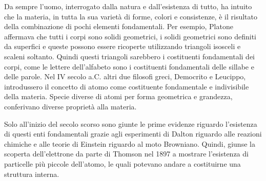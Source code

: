 \documentclass[../main.tex]{subfiles}
\begin{document}
Da sempre l'uomo, interrogato dalla natura e dall'esistenza di tutto, ha intuito che la materia, in tutta la sua varietà di forme, colori e consistenze, è il risultato della combinazione di pochi elementi fondamentali. Per esempio, Platone affermava che tutti i corpi sono solidi geometrici, i solidi geometrici sono definiti da superfici e queste possono essere ricoperte utilizzando triangoli isosceli e scaleni soltanto. Quindi questi triangoli sarebbero i costituenti fondamentali dei corpi, come le lettere dell'alfabeto sono i costituenti fondamentali delle sillabe e delle parole. Nel IV secolo a.C. altri due filosofi greci, Democrito e Leucippo, introdussero il concetto di atomo come costituente fondamentale e indivisibile della materia. Specie diverse di atomi per forma geometrica e grandezza, conferivano diverse proprietà alla materia.

Solo all'inizio del secolo scorso sono giunte le prime evidenze riguardo l'esistenza di questi enti fondamentali grazie agli esperimenti di Dalton riguardo alle reazioni chimiche e alle teorie di Einstein riguardo al moto Browniano. Quindi, giunse la scoperta dell'elettrone da parte di Thomson nel 1897 a mostrare l'esistenza di particelle più piccole dell'atomo, le quali potevano andare a costituirne una struttura interna.
\end{document}
